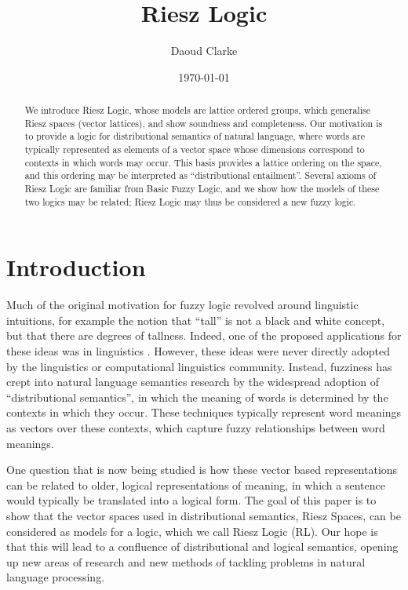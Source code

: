 \documentclass[preprint,leqno]{elsarticle}
\author{Daoud Clarke}
\date{\today}
\title{Riesz Logic}
\begin{document}
\begin{abstract}
We introduce Riesz Logic, whose models are lattice ordered groups,
which generalise Riesz spaces (vector lattices), and show soundness
and completeness. Our motivation is to provide a logic for
distributional semantics of natural language, where words are
typically represented as elements of a vector space whose dimensions
correspond to contexts in which words may occur. This basis provides a
lattice ordering on the space, and this ordering may be interpreted as
``distributional entailment''. Several axioms of Riesz Logic are
familiar from Basic Fuzzy Logic, and we show how the models of these
two logics may be related; Riesz Logic may thus be considered a new
fuzzy logic.
\end{abstract}

\maketitle


\section{Introduction}

Much of the original motivation for fuzzy logic revolved around
linguistic intuitions, for example the notion that ``tall'' is not a
black and white concept, but that there are degrees of
tallness. Indeed, one of the proposed applications for these ideas was
in linguistics \cite{Zadeh:73}. However, these ideas were never
directly adopted by the linguistics or computational linguistics
community. Instead, fuzziness has crept into natural language
semantics research by the widespread adoption of ``distributional
semantics'', in which the meaning of words is determined by the
contexts in which they occur. These techniques typically represent
word meanings as vectors over these contexts, which capture fuzzy
relationships between word meanings.

One question that is now being studied is how these vector based
representations can be related to older, logical representations of
meaning, in which a sentence would typically be translated into a
logical form. The goal of this paper is to show that the vector spaces
used in distributional semantics, Riesz Spaces, can be considered as
models for a logic, which we call Riesz Logic (RL). Our hope is that
this will lead to a confluence of distributional and logical
semantics, opening up new areas of research and new methods of
tackling problems in natural language processing.
\end{document}
